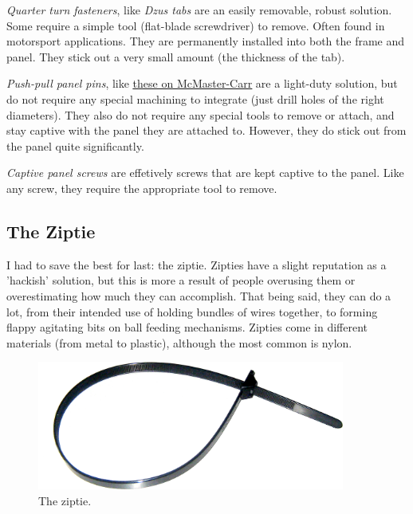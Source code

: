 \documentclass[10pt,letterpaper]{book}
\begin{document}
	\begin{asparaenum}[a)]
		\item \textit{Quarter turn fasteners}, like \textit{Dzus tabs} are an easily removable, robust solution. Some require a simple tool (flat-blade screwdriver) to remove. Often found in motorsport applications. They are permanently installed into both the frame and panel. They stick out a very small amount (the thickness of the tab).
		\item \textit{Push-pull panel pins}, like \href{https://www.mcmaster.com/panel-fasteners/screws-and-bolts/push-pull-captive-panel-screws/}{\color{red}\underline{these on McMaster-Carr}} are a light-duty solution, but do not require any special machining to integrate (just drill holes of the right diameters). They also do not require any special tools to remove or attach, and stay captive with the panel they are attached to. However, they do stick out from the panel quite significantly.
		\item \textit{Captive panel screws} are effetively screws that are kept captive to the panel. Like any screw, they require the appropriate tool to remove.
	\end{asparaenum}
	
	\subsection{The Ziptie}
	I had to save the best for last: the ziptie. Zipties have a slight reputation as a 'hackish' solution, but this is more a result of people overusing them or overestimating how much they can accomplish. That being said, they can do a lot, from their intended use of holding bundles of wires together, to forming flappy agitating bits on ball feeding mechanisms. Zipties come in different materials (from metal to plastic), although the most common is nylon.
	
	\begin{figure}[H]
		\includegraphics[width=0.9\textwidth]{imgs/ziptie.png}
		\caption{The ziptie.}
	\end{figure}
	
\end{document}
